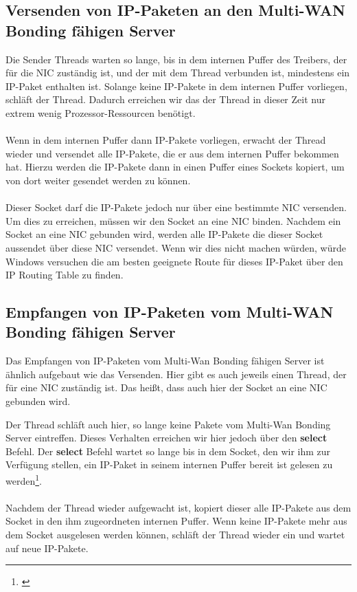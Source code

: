 \subsection{Versenden von IP-Paketen an den Multi-WAN Bonding fähigen Server}
Die Sender Threads warten so lange, bis in dem internen Puffer des Treibers, der für die NIC zuständig ist, und der mit dem Thread verbunden ist, mindestens ein IP-Paket enthalten ist. Solange keine IP-Pakete in dem internen Puffer vorliegen, schläft der Thread. Dadurch erreichen wir das der Thread in dieser Zeit nur extrem wenig Prozessor-Ressourcen benötigt.
\\\\
Wenn in dem internen Puffer dann IP-Pakete vorliegen, erwacht der Thread wieder und versendet alle IP-Pakete, die er aus dem internen Puffer bekommen hat. Hierzu werden die IP-Pakete dann in einen Puffer eines Sockets kopiert, um von dort weiter gesendet werden zu können. 
\\\\
Dieser Socket darf die IP-Pakete jedoch nur über eine bestimmte NIC versenden. Um dies zu erreichen, müssen wir den Socket an eine NIC binden. Nachdem ein Socket an eine NIC gebunden wird, werden alle IP-Pakete die dieser Socket aussendet über diese NIC versendet. Wenn wir dies nicht machen würden, würde Windows versuchen die am besten geeignete Route für dieses IP-Paket über den IP Routing Table zu finden.

\subsection{Empfangen von IP-Paketen vom Multi-WAN Bonding fähigen Server}
Das Empfangen von IP-Paketen vom Multi-Wan Bonding fähigen Server ist ähnlich aufgebaut wie das Versenden. Hier gibt es auch jeweils einen Thread, der für eine NIC zuständig ist. Das heißt, dass auch hier der Socket an eine NIC gebunden wird.

\newpage
\noindent
Der Thread schläft auch hier, so lange keine Pakete vom Multi-Wan Bonding Server eintreffen. Dieses Verhalten erreichen wir hier jedoch über den \textbf{select} Befehl. Der \textbf{select} Befehl wartet so lange bis in dem Socket, den wir ihm zur Verfügung stellen, ein IP-Paket in seinem internen Puffer bereit ist gelesen zu werden\footnote[1]{\cite[Vgl.][]{18}}. 
\\\\
Nachdem der Thread wieder aufgewacht ist, kopiert dieser alle IP-Pakete aus dem Socket in den ihm zugeordneten internen Puffer. Wenn keine IP-Pakete mehr aus dem Socket ausgelesen werden können, schläft der Thread wieder ein und wartet auf neue IP-Pakete.
